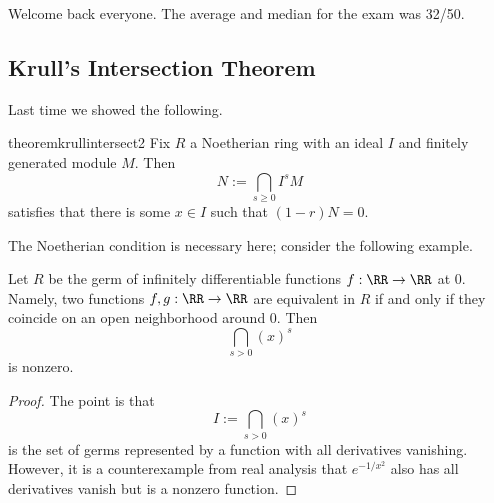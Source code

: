 
Welcome back everyone. The average and median for the exam was 32/50.

\subsection{Krull's Intersection Theorem}
Last time we showed the following.
\begin{restatable}{theorem}{krullintersect2}
	Fix $R$ a Noetherian ring with an ideal $I$ and finitely generated module $M$. Then
	\[N:=\bigcap_{s\ge0}I^sM\]
	satisfies that there is some $x\in I$ such that $(1-r)N=0$.
\end{restatable} %
\noindent The Noetherian condition is necessary here; consider the following example.
\begin{exe}
	Let $R$ be the germ of infinitely differentiable functions $f:\RR\to\RR$ at $0$. Namely, two functions $f,g:\RR\to\RR$ are equivalent in $R$ if and only if they coincide on an open neighborhood around $0$. Then
	\[\bigcap_{s>0}(x)^s\]
	is nonzero.
\end{exe}
\begin{proof}
	The point is that
	\[I:=\bigcap_{s>0}(x)^s\]
	is the set of germs represented by a function with all derivatives vanishing. However, it is a counterexample from real analysis that $e^{-1/x^2}$ also has all derivatives vanish but is a nonzero function.
\end{proof}

